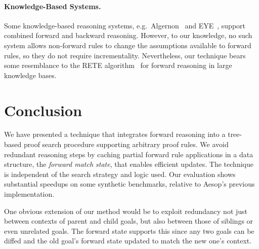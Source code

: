 \documentclass[runningheads,leqno]{llncs}
\newcommand{\para}[1]{\paragraph{\bfseries\upshape #1}}
\begin{document}
\para{Knowledge-Based Systems.}
Some knowledge-based reasoning systems, e.g.\ Algernon~\cite{Algernon} and EYE~\cite{EYE}, support combined forward and backward reasoning.
However, to our knowledge, no such system allows non-forward rules to change the assumptions available to forward rules, so they do not require incrementality.
Nevertheless, our technique bears some resemblance to the RETE algorithm~\cite{RETE} for forward reasoning in large knowledge bases.

\section{Conclusion}

We have presented a technique that integrates forward reasoning into a tree-based proof search procedure supporting arbitrary proof rules.
We avoid redundant reasoning steps by caching partial forward rule applications in a data structure, the \emph{forward match state}, that enables efficient updates.
The technique is independent of the search strategy and logic used.
Our evaluation shows substantial speedups on some synthetic benchmarks, relative to Aesop's previous implementation.

One obvious extension of our method would be to exploit redundancy not just between contexts of parent and child goals, but also between those of siblings or even unrelated goals.
The forward state supports this since any two goals can be diffed and the old goal's forward state updated to match the new one's context.


\end{document}
